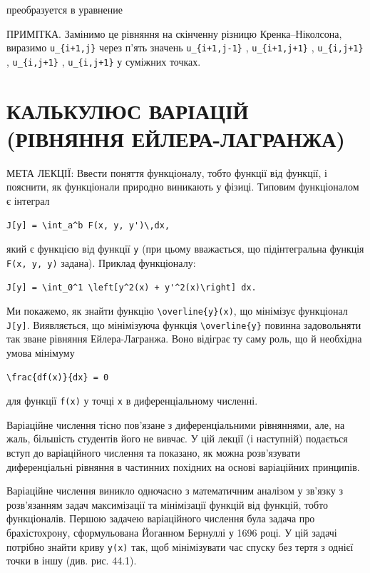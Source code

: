 \documentclass[
  ukrainian,
]{article}
\begin{document}
преобразуется в уравнение

ПРИМІТКА. Замінимо це рівняння на скінченну різницю Кренка--Ніколсона,
виразимо \texttt{u\_\{i+1,j\}} через п'ять значень
\texttt{u\_\{i+1,j-1\}} , \texttt{u\_\{i+1,j+1\}} ,
\texttt{u\_\{i,j+1\}} , \texttt{u\_\{i,j+1\}} , \texttt{u\_\{i,j+1\}} у
суміжних точках.

\section{КАЛЬКУЛЮС ВАРІАЦІЙ (РІВНЯННЯ
ЕЙЛЕРА-ЛАГРАНЖА)}\label{ux43aux430ux43bux44cux43aux443ux43bux44eux441-ux432ux430ux440ux456ux430ux446ux456ux439-ux440ux456ux432ux43dux44fux43dux43dux44f-ux435ux439ux43bux435ux440ux430-ux43bux430ux433ux440ux430ux43dux436ux430}

МЕТА ЛЕКЦІЇ: Ввести поняття функціоналу, тобто функції від функції, і
пояснити, як функціонали природно виникають у фізиці. Типовим
функціоналом є інтеграл

\begin{verbatim}
J[y] = \int_a^b F(x, y, y')\,dx,
\end{verbatim}

який є функцією від функції \texttt{y} (при цьому вважається, що
підінтегральна функція \texttt{F(x,\ y,\ y\textquotesingle{})} задана).
Приклад функціоналу:

\begin{verbatim}
J[y] = \int_0^1 \left[y^2(x) + y'^2(x)\right] dx.
\end{verbatim}

Ми покажемо, як знайти функцію
\texttt{\textbackslash{}overline\{y\}(x)}, що мінімізує функціонал
\texttt{J{[}y{]}}. Виявляється, що мінімізуюча функція
\texttt{\textbackslash{}overline\{y\}} повинна задовольняти так зване
рівняння Ейлера-Лагранжа. Воно відіграє ту саму роль, що й необхідна
умова мінімуму

\begin{verbatim}
\frac{df(x)}{dx} = 0
\end{verbatim}

для функції \texttt{f(x)} у точці \texttt{x} в диференціальному
численні.

Варіаційне числення тісно пов'язане з диференціальними рівняннями, але,
на жаль, більшість студентів його не вивчає. У цій лекції (і наступній)
подається вступ до варіаційного числення та показано, як можна
розв'язувати диференціальні рівняння в частинних похідних на основі
варіаційних принципів.

Варіаційне числення виникло одночасно з математичним аналізом у зв'язку
з розв'язанням задач максимізації та мінімізації функцій від функцій,
тобто функціоналів. Першою задачею варіаційного числення була задача про
брахістохрону, сформульована Йоганном Бернуллі у 1696 році. У цій задачі
потрібно знайти криву \texttt{y(x)} так, щоб мінімізувати час спуску без
тертя з однієї точки в іншу (див. рис. 44.1).
\end{document}
